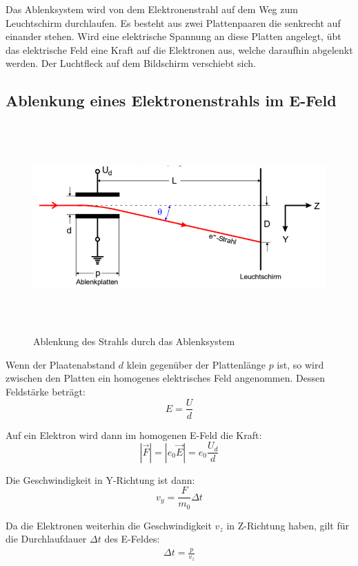 Das Ablenksystem wird von dem Elektronenstrahl auf dem Weg zum Leuchtschirm durchlaufen. Es besteht aus
zwei Plattenpaaren die senkrecht auf einander stehen. Wird eine elektrische Spannung an diese Platten angelegt, übt das
elektrische Feld eine Kraft auf die Elektronen aus, welche daraufhin abgelenkt werden.
Der Luchtfleck auf dem Bildschirm verschiebt sich.

\subsection{Ablenkung eines Elektronenstrahls im E-Feld}

\begin{figure}[H]
  \centering
  \includegraphics[height=8cm]{ablenkungefeld.PNG}
  \caption{Ablenkung des Strahls durch das Ablenksystem}
  \label{fig:ablenkung}
\end{figure}

Wenn der Plaatenabstand $d$ klein gegenüber der Plattenlänge $p$ ist, so wird zwischen den Platten
ein homogenes elektrisches Feld angenommen. Dessen Feldstärke beträgt:
\begin{equation}
  E = \frac{U}{d}
\end{equation}

Auf ein Elektron wird dann im homogenen E-Feld die Kraft:
\begin{equation}
  |\vec{F}| = |e_0 \vec{E}| = e_0 \frac{U_d}{d}
\end{equation}

Die Geschwindigkeit in Y-Richtung ist dann:
\begin{equation}
  v_y = \frac{F}{m_0} \Delta t
\end{equation}

Da die Elektronen weiterhin die Geschwindigkeit $v_z$ in Z-Richtung haben, gilt für
die Durchlaufdauer $\Delta t$ des E-Feldes:
\begin{align}
  \Delta t = \frac{p}{v_z}
\end{align}

